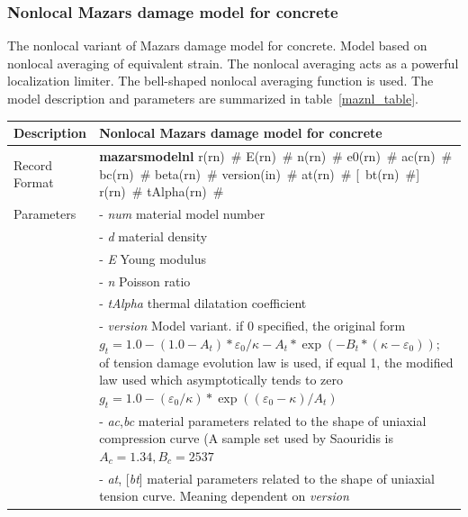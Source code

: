 \documentclass[epsf,a4paper]{article}
\newcommand{\descitem}[1]{{\noindent \bf #1}}
\newcommand{\elemparam}[2]{{{#1\tiny (#2)}~\#}}
\newcommand{\optelemparam}[2]{[{~\elemparam{#1}{#2}}]}
\newcommand{\param}[1]{{\it #1}}
\newcommand{\optparam}[1]{[{\it #1}]}
\begin{document}
\subsubsection{Nonlocal Mazars damage model for concrete}
The nonlocal variant of Mazars damage model for concrete.
Model based on nonlocal averaging of equivalent strain.
The nonlocal averaging acts as a powerful localization
limiter. The bell-shaped nonlocal averaging function is used.
The model description and parameters are summarized
in table~\ref{maznl_table}.

\begin{table}[h]                                                                
\begin{tabular}{|l|p{9cm}|}                                                      
\hline                                                                          
Description & Nonlocal Mazars damage model for concrete\\
\hline                                                                          
Record Format & \descitem{mazarsmodelnl} \elemparam{r}{rn} \elemparam{E}{rn}
\elemparam{n}{rn}  \elemparam{e0}{rn}
\elemparam{ac}{rn} \elemparam{bc}{rn} \elemparam{beta}{rn}
\elemparam{version}{in} \elemparam{at}{rn} \optelemparam{bt}{rn} \elemparam{r}{rn}
\elemparam{tAlpha}{rn} \\
Parameters &- \param{num} material model number\\
&- \param{d} material density\\
&- \param{E} Young modulus\\
&- \param{n} Poisson ratio\\
&- \param{tAlpha} thermal dilatation coefficient\\
&- \param{version} Model variant. if 0 specified, the original form 
$g_t   = 1.0-(1.0-A_t)*\varepsilon_0/\kappa - A_t*\exp(-B_t*(\kappa-\varepsilon_0));
$ of
tension damage evolution law is used, if equal 1, the modified law
used which asymptotically tends to zero 
$g_t = 1.0-(\varepsilon_0/\kappa)*\exp((\varepsilon_0-\kappa)/A_t)$\\
&- \param{ac},\param{bc} material parameters related to the shape of
uniaxial compression curve (A sample set used by Saouridis is $A_c =
1.34, B_c = 2537$\\
&- \param{at}, \optparam{bt} material parameters related to the shape of
uniaxial tension curve. Meaning dependent on \param{version}

\end{tabular}
\end{table}
\end{document}
